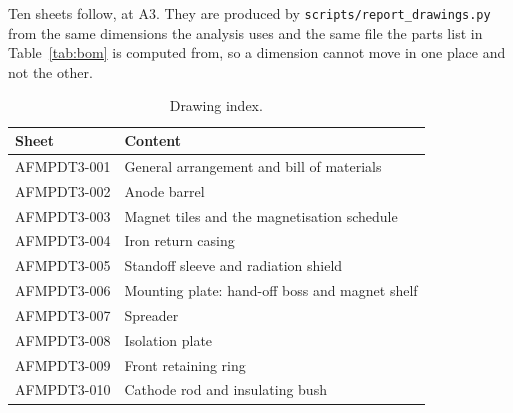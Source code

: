 \documentclass[11pt,a4paper]{article}
\begin{document}
Ten sheets follow, at A3. They are produced by
\texttt{scripts/report\_drawings.py} from the same dimensions the analysis uses
and the same file the parts list in Table~\ref{tab:bom} is computed from, so a
dimension cannot move in one place and not the other.

\begin{table}[H]
\centering
\caption{Drawing index.}
\label{tab:drawings}
\begin{tabular}{ll}
\toprule
\textbf{Sheet} & \textbf{Content} \\
\midrule
AFMPDT3-001 & General arrangement and bill of materials \\
AFMPDT3-002 & Anode barrel \\
AFMPDT3-003 & Magnet tiles and the magnetisation schedule \\
AFMPDT3-004 & Iron return casing \\
AFMPDT3-005 & Standoff sleeve and radiation shield \\
AFMPDT3-006 & Mounting plate: hand-off boss and magnet shelf \\
AFMPDT3-007 & Spreader \\
AFMPDT3-008 & Isolation plate \\
AFMPDT3-009 & Front retaining ring \\
AFMPDT3-010 & Cathode rod and insulating bush \\
\bottomrule
\end{tabular}
\end{table}


\end{document}
